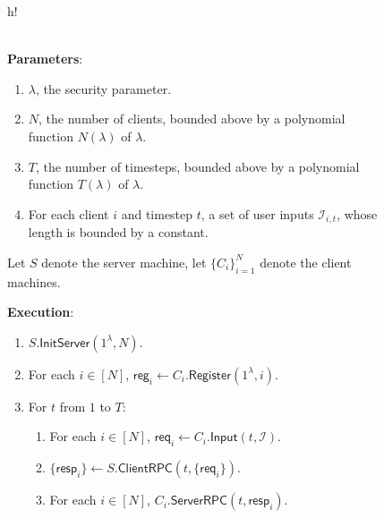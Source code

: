 \documentclass[sigconf, nonacm, balance=false, natbib=false, screen]{acmart}
\newcommand{\reg}{\mathsf{reg}}
\newcommand{\req}{\mathsf{req}}
\newcommand{\resp}{\mathsf{resp}}
\newcommand{\cI}{\mathcal{I}}
\begin{document}
\begin{figure}{h!}
\begin{framed}
\begin{definition}  \hfill\\
    
\textbf{Parameters}: \begin{enumerate}
    \item $\lambda$, the security parameter.
    \item $N$, the number of clients, bounded above by a polynomial function $N(\lambda)$ of $\lambda$.
    \item $T$, the number of timesteps, bounded above by a polynomial function $T(\lambda)$ of $\lambda$.
    \item For each client $i$ and timestep $t$, a set of user inputs $\cI_{i, t}$, whose length is bounded by a constant.
\end{enumerate}

Let $S$ denote the server machine, let $\{C_i\}_{i = 1}^N$ denote the client machines.

\textbf{Execution}:
\begin{enumerate}
\item $S.\mathsf{InitServer}(1^{\lambda}, N)$. 
\item For each $i \in [N]$, $\reg_i \leftarrow C_i.\mathsf{Register}(1^{\lambda}, i)$. 
\item For $t$ from $1$ to $T$:
    \begin{enumerate}
    \item For each $i \in [N]$, $\req_i \leftarrow C_i.\mathsf{Input}(t, \cI)$.
    
    \item $\{\resp_i\} \leftarrow S.\mathsf{ClientRPC}(t, \{\req_i\})$.
    
    \item For each $i \in [N]$, $C_i.\mathsf{ServerRPC}(t, \resp_i)$.
    \end{enumerate}
\end{enumerate}
\end{definition}
\end{framed}
\end{figure}
\end{document}
